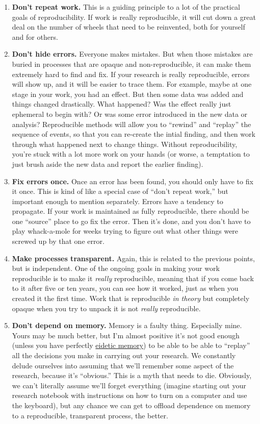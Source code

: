 \documentclass{book}
\begin{document}
\begin{enumerate}
\item \textbf{Don't repeat work.} This is a guiding principle to a lot of the practical goals of reproducibility. If work is really reproducible, it will cut down a great deal on the number of wheels that need to be reinvented, both for yourself and for others.
\item \textbf{Don't hide errors.} Everyone makes mistakes. But when those mistakes are buried in processes that are opaque and non-reproducible, it can make them extremely hard to find and fix.  If your research is really reproducible, errors will show up, and it will be easier to trace them.  For example, maybe at one stage in your work, you had an effect. But then some data was added and things changed drastically. What happened? Was the effect really just ephemeral to begin with? Or was some error introduced in the new data or analysis?  Reproducible methods will allow you to ``rewind'' and ``replay'' the sequence of events, so that you can re-create the intial finding, and then work through what happened next to change things. Without reproducibility, you're stuck with a lot more work on your hands (or worse, a temptation to just brush aside the new data and report the earlier finding).
\item \textbf{Fix errors once.} Once an error has been found, you should only have to fix it once.  This is kind of like a special case of ``don't repeat work,'' but important enough to mention separately. Errors have a tendency to propagate. If your work is maintained as fully reproducible, there should be one ``source'' place to go fix the error.  Then it's done, and you don't have to play whack-a-mole for weeks trying to figure out what other things were screwed up by that one error.
\item \textbf{Make processes transparent.} Again, this is related to the previous points, but is independent.  One of the ongoing goals in making your work reproducible is to make it \emph{really} reproducible, meaning that if you come back to it after five or ten years, you can see how it worked, just as when you created it the first time.  Work that is reproducible \emph{in theory} but completely opaque when you try to unpack it is not \emph{really} reproducible.
\item \textbf{Don't depend on memory.} Memory is a faulty thing. Especially mine. Yours may be much better, but I'm almost positive it's not good enough (unless you have perfectly \href{http://en.wikipedia.org/wiki/Eidetic_memory}{eidetic memory}) to be able to be able to ``replay'' all the decisions you make in carrying out your research. We constantly delude ourselves into assuming that we'll remember some aspect of the research, because it's ``obvious.''  This is a myth that needs to die. Obviously, we can't literally assume we'll forget everything (imagine starting out your research notebook with instructions on how to turn on a computer and use the keyboard), but any chance we can get to offload dependence on memory to a reproducible, transparent process, the better.
\end{enumerate}
\end{document}
